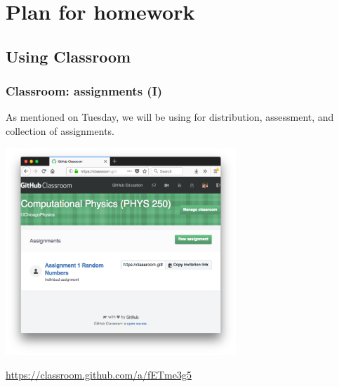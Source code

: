 \documentclass[hyperref={colorlinks=true}]{beamer}
\begin{document}
\section[Plan for homework]{Plan for homework}

\subsection[Using \github Classroom]{Using \github Classroom}


\begin{frame}%
  \frametitle{\github Classroom: assignments (I)}
  
  As mentioned on Tuesday, we will be using \github for distribution, assessment, and collection of assignments. 
  
  \begin{center}
    \includegraphics[width=0.65\textwidth]{GitHubClassroom-Assignment1.png}
  \end{center}
  
  \vspace{-1cm}
  
  \centering \url{https://classroom.github.com/a/fETme3g5}

\end{frame}

\end{document}
